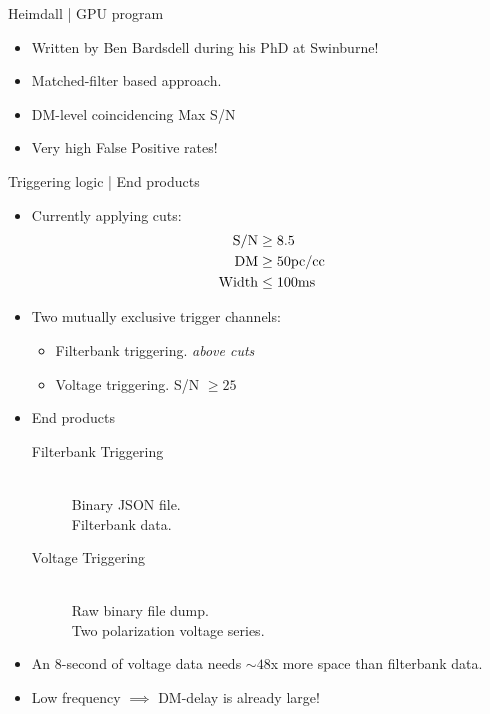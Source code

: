 \begin{frame}{Heimdall | GPU program}
	\begin{itemize}
		\item Written by Ben Bardsdell during his PhD at Swinburne!
		\item Matched-filter based approach. 
	\end{itemize}
	\begin{itemize}
		\item DM-level coincidencing \hfill Max S/N
		\item Very high False Positive rates!
	\end{itemize}
\end{frame}

\begin{frame}[allowframebreaks]{Triggering logic | End products}
	\begin{itemize}
		\item Currently applying cuts: 
		\begin{align}
			{\rm S/N} &\geq 8.5 \\
			{\rm DM}  &\geq 50 {\rm pc/cc} \\
			{\rm Width} &\leq 100 {\rm ms}
		\end{align}
		\item Two mutually exclusive trigger channels: 
			\begin{itemize}
				\item Filterbank triggering. \hfill \emph{above cuts}
				\item Voltage triggering. \hfill S/N $\geq 25$
			\end{itemize}
		\item End products
			\begin{description}
				\item[Filterbank Triggering] \\ 
					Binary JSON file. \\
					Filterbank data.
				\item[Voltage Triggering] \\
					Raw binary file dump. \\
					Two polarization voltage series.
			\end{description}
		\item An $8$-second of voltage data needs $\sim 48$x more space than filterbank data. 
		\item Low frequency $\implies$ DM-delay is already large!
	\end{itemize}
\end{frame}

